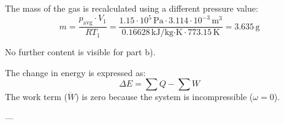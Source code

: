The mass of the gas is recalculated using a different pressure value:  
\[
m = \frac{p_{\text{avg}} \cdot V_1}{R T_1} = \frac{1.15 \cdot 10^5 \, \text{Pa} \cdot 3.114 \cdot 10^{-3} \, \text{m}^3}{0.16628 \, \text{kJ/kg·K} \cdot 773.15 \, \text{K}} = 3.635 \, \text{g}
\]  

No further content is visible for part b).

The change in energy is expressed as:  
\[
\Delta E = \sum Q - \sum W
\]  
The work term (\( \dot{W} \)) is zero because the system is incompressible (\( \omega = 0 \)).

---